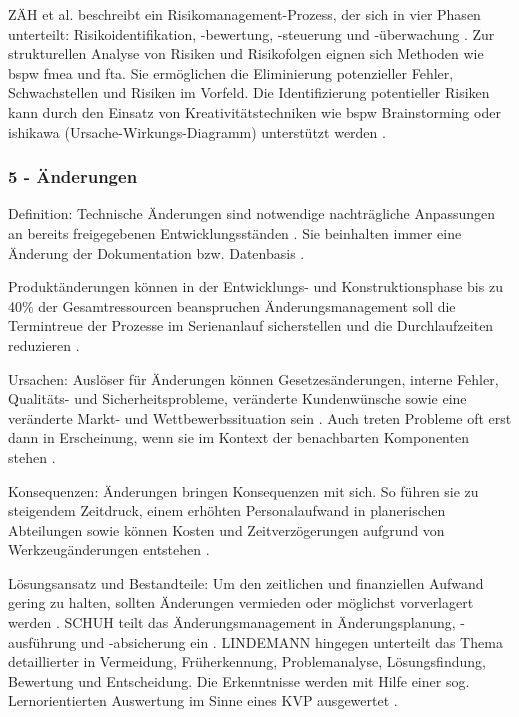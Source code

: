 ZÄH et al. beschreibt ein Risikomanagement-Prozess, der sich in vier Phasen unterteilt: Risikoidentifikation, -bewertung, -steuerung und -überwachung \cite{Zaeh2004}. 
Zur strukturellen Analyse von Risiken und Risikofolgen eignen sich  Methoden wie \gls{bspw} \gls{fmea} und \gls{fta}. Sie ermöglichen die Eliminierung potenzieller Fehler, Schwachstellen und Risiken im Vorfeld.
Die Identifizierung potentieller Risiken kann durch den Einsatz von Kreativitätstechniken wie \gls{bspw} Brainstorming oder \gls{ishikawa} (Ursache-Wirkungs-Diagramm) unterstützt werden \cite[41]{Bischoff2007}. 

\subsubsection*{5 - Änderungen}

Definition: 
Technische Änderungen sind notwendige nachträgliche Anpassungen an bereits freigegebenen Entwicklungsständen \cite{Zanner2002}. Sie beinhalten immer eine Änderung der Dokumentation bzw. Datenbasis \cite[47]{Niemerg1997}. 	

Produktänderungen können in der Entwicklungs- und Konstruktionsphase bis zu 40\% der Gesamtressourcen beanspruchen \cite{Lindemann1998}
Änderungsmanagement soll die Termintreue der Prozesse im Serienanlauf sicherstellen und die Durchlaufzeiten reduzieren \cite[216]{Schuh2008}. 

Ursachen: 
Auslöser für Änderungen können Gesetzesänderungen, interne Fehler, Qualitäts- und Sicherheitsprobleme, veränderte Kundenwünsche sowie eine veränderte Markt- und Wettbewerbssituation sein \cite{Zanner2002}. Auch treten Probleme oft erst dann in Erscheinung, wenn sie im Kontext der benachbarten Komponenten stehen \cite[24]{Kuhn2002}.

Konsequenzen: 
Änderungen bringen Konsequenzen mit sich. So führen sie zu steigendem Zeitdruck, einem erhöhten Personalaufwand in planerischen Abteilungen sowie können Kosten und Zeitverzögerungen aufgrund von Werkzeugänderungen entstehen \cite[24]{Kuhn2002}. 

Lösungsansatz und Bestandteile: 
Um den zeitlichen und finanziellen Aufwand gering zu halten, sollten Änderungen vermieden oder möglichst vorverlagert werden \cite{Schuh2008, Jania2004, Ass98}. 
SCHUH teilt das Änderungsmanagement in Änderungsplanung, -ausführung und -absicherung ein \cite[217]{Schuh2008}. 
LINDEMANN hingegen unterteilt das Thema detaillierter in Vermeidung, Früherkennung, Problemanalyse, Lösungsfindung, Bewertung und Entscheidung. Die Erkenntnisse werden mit Hilfe einer sog. Lernorientierten Auswertung im Sinne eines KVP ausgewertet \cite{Lindemann1998}. 

